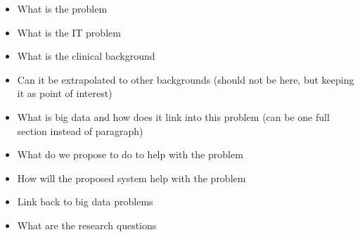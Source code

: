 \begin{itemize}
	\item What is the problem	
	\item 	What is the IT problem
	\item 	What is the clinical background
	\item	Can it be extrapolated to other backgrounds (should not be here, but keeping it as point of interest)
	\item 	What is big data and how  does it link into this problem (can be one full section instead of paragraph)
	\item 	What do we propose to do to help with the problem
	\item 	How will the proposed system help with the problem
	\item 	Link back to big data problems
	\item 	What are the research questions
\end{itemize}